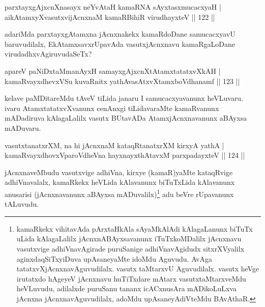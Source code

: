 
\begin{shl}
parxtayxgAjxcnXnasayx neYvAtaH kamaRNA sAyxtasxmucacxyaH |\\
aikAtamxyXvasutxvijAcnxnaM kamaRBihiR virudhayxteV \hfill || 122 ||
\end{shl}

\begin{artha}
adariMda parxtayxgAtamxna jAcnxnakekx kamaRdoDane samucacxyavU baruvudilalx, EkAtamxsavxrUpavAda vasutxjAcnxnavu kamaRgaLoDane virudadhxvAgiruvudaSeTx?
\end{artha}


\begin{shl}
apareV paNiDxtaMmanAyxH samayxgAjxcnXtAtamxtatatxvXkAH |\\
kamaRvayxdhevxVSu kuvaRnitx yathAvasAtxvXtamxboVdhanamf \hfill || 123 ||
\end{shl}

\begin{artha}
kelave paMDitareMdu tAveV tiLida janaru I samucacxyavanunx heVLuvaru. ivaru AtamxtatatxvXvanunx cenAnxgi tiLidavaraMte kamaRvanunx mADadiruva kAlagaLalilx vasutx BUtavADa AtamxjAcnxnavanunx aBAyxsa mADuvaru.
\end{artha}


\begin{shl}
vasutxtanatxrXM, na hi jAcnxnaM kataqRtanatxrXM kirxyA yathA |\\
kamaRvayxdhovxVparoVdheVna hayxnayxthAtavxM parxpadayxteV \hfill || 124 ||
\end{shl}

\begin{artha}
jAcnxnaveMbudu vasutxvige adhiVna, kirxye (kamaR)yaMte kataqRvige adhiVnavalalx, kamaRkekx heVLida kAlavanunx biTuTxLida kAlavanunx anusarisi (jAcnxnavanunx aBAyxsa mADuvalilx)\footnote{kamaRkekx vihitavAda pArxtaHkAla sAyaMkAlAdi kAlagaLanunx biTuTx uLida kAlagaLalilx jAcnxnABAyxsavanunx iTuTxkoMDalilx jAcnxnavu vasutxvige adhiVnavAgirade puruSanige adhiVnavAgidudx sitxrXVyalilx aginxdaqSiTxyiDuva upAsaneyaMte idoMdu Aguvudu. AvAga tatatxvXjAcnxnavAguvudilalx. vasutx taMtarxvU Aguvudilalx. vasutx heVge irutatxdo hAgeyeV jAcnxnavu huTiTxdare mAtarx vasutxtaMtarxveMdu heVLuvudu, adilalxde puruSanu tananx icACxnusAra mADikoLuLxva jAcnxna jAcnxnavAguvudilalx, adoMdu upAsaneyAdiVteMdu BAvAthaR.} adu beVre rUpavanunx tALuvudu.
\end{artha}

